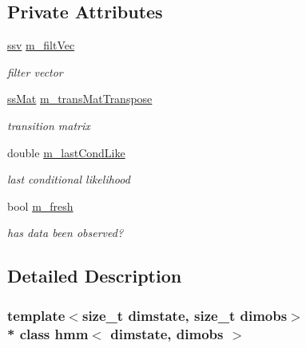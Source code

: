\subsection*{Private Attributes}
\begin{DoxyCompactItemize}
\item 
\hyperlink{classcf__filter_a5562e379d385df4d81c949e32d84ee19}{ssv} \hyperlink{classhmm_a1d95a240203405976193cc9792b83a67}{m\+\_\+filt\+Vec}\hypertarget{classhmm_a1d95a240203405976193cc9792b83a67}{}\label{classhmm_a1d95a240203405976193cc9792b83a67}

\begin{DoxyCompactList}\small\item\em filter vector \end{DoxyCompactList}\item 
\hyperlink{classhmm_a1c1d1649a78ddbe6029556fd1e10d0ab}{ss\+Mat} \hyperlink{classhmm_a27c26b0248bafd930ff33278ec1c4c10}{m\+\_\+trans\+Mat\+Transpose}\hypertarget{classhmm_a27c26b0248bafd930ff33278ec1c4c10}{}\label{classhmm_a27c26b0248bafd930ff33278ec1c4c10}

\begin{DoxyCompactList}\small\item\em transition matrix \end{DoxyCompactList}\item 
double \hyperlink{classhmm_ad02a43632a0cc42b96730ddb0cf6d538}{m\+\_\+last\+Cond\+Like}\hypertarget{classhmm_ad02a43632a0cc42b96730ddb0cf6d538}{}\label{classhmm_ad02a43632a0cc42b96730ddb0cf6d538}

\begin{DoxyCompactList}\small\item\em last conditional likelihood \end{DoxyCompactList}\item 
bool \hyperlink{classhmm_ad5e43bdfcbdf90cc610a1d9148755c46}{m\+\_\+fresh}\hypertarget{classhmm_ad5e43bdfcbdf90cc610a1d9148755c46}{}\label{classhmm_ad5e43bdfcbdf90cc610a1d9148755c46}

\begin{DoxyCompactList}\small\item\em has data been observed? \end{DoxyCompactList}\end{DoxyCompactItemize}


\subsection{Detailed Description}
\subsubsection*{template$<$size\+\_\+t dimstate, size\+\_\+t dimobs$>$\\*
class hmm$<$ dimstate, dimobs $>$}

